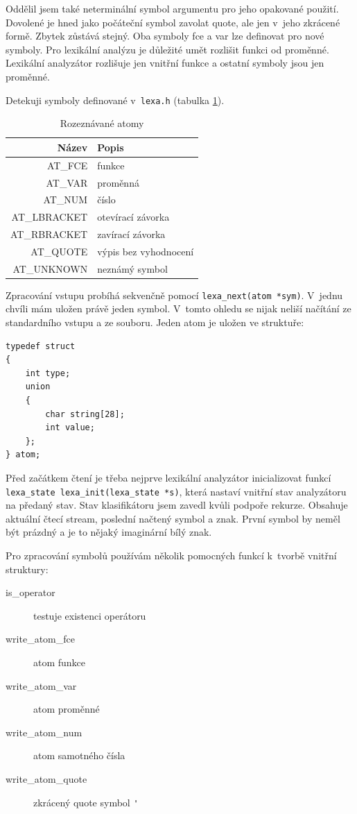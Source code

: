 \documentclass[a4paper, 12pt]{article}
\begin{document}
Oddělil jsem také neterminální symbol argumentu pro jeho opakované
použití. Dovolené je hned jako počáteční symbol zavolat quote,
ale jen v~jeho zkrácené formě. Zbytek zůstává stejný. Oba symboly
fce a var lze definovat pro nové symboly. Pro lexikální analýzu
je důležité umět rozlišit funkci od proměnné. Lexikální analyzátor
rozlišuje jen vnitřní funkce a ostatní symboly jsou jen proměnné.

Detekuji symboly definované v~\texttt{lexa.h} (tabulka
\ref{tab:atom}).

\begin{table}
\centering
\begin{tabular}{|r|l|}
\hline
Název & Popis\\ \hline\hline
AT\_FCE & funkce\\ \hline
AT\_VAR & proměnná\\ \hline
AT\_NUM & číslo\\ \hline
AT\_LBRACKET & otevírací závorka\\ \hline
AT\_RBRACKET & zavírací závorka\\ \hline
AT\_QUOTE & výpis bez vyhodnocení\\ \hline
AT\_UNKNOWN & neznámý symbol\\
\hline
\end{tabular}
\caption{Rozeznávané atomy}
\label{tab:atom}
\end{table}

Zpracování vstupu probíhá sekvenčně pomocí \verb+lexa_next(atom *sym)+.
V~jednu chvíli mám uložen právě jeden symbol. V~tomto ohledu se nijak
neliší načítání ze standardního vstupu a ze souboru. Jeden atom
je uložen ve struktuře:

\begin{lstlisting}
typedef struct
{
    int type;
    union
    {
        char string[28];
        int value;
    };
} atom;
\end{lstlisting}

Před začátkem čtení je třeba nejprve lexikální analyzátor inicializovat
funkcí \verb+lexa_state lexa_init(lexa_state *s)+, která nastaví vnitřní
stav analyzátoru na předaný stav. Stav klasifikátoru jsem zavedl kvůli
podpoře rekurze. Obsahuje aktuální čtecí stream, poslední načtený symbol
a znak. První symbol by neměl být prázdný a je to nějaký imaginární
bílý znak.

Pro zpracování symbolů používám několik pomocných funkcí k~tvorbě vnitřní
struktury:

\begin{description}
  \item[is\_operator] testuje existenci operátoru
  \item[write\_atom\_fce] atom funkce
  \item[write\_atom\_var] atom proměnné
  \item[write\_atom\_num] atom samotného čísla
  \item[write\_atom\_quote] zkrácený quote symbol \verb+'+
\end{description}
\end{document}
